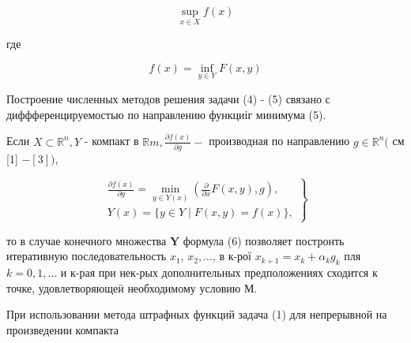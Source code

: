 \documentclass[10pt]{article}
\begin{document}
\[

\sup _{x \in X} f(x)

\]



где



\[

f(x)=\inf _{y \in Y} F(x, y)

\]



Построение численных методов решения задачи (4) - (5) связано с диффференцируемостью по направлению функциіг минимума (5).



Если $X \subset \mathbb{R}^{n}, Y$ - компакт в $\mathbb{R} m, \frac{\partial f(x)}{\partial g}-$ производная по направлению $g \in \mathbb{R}^{n}($ см [1] $-[3])$,



\[

\left.\begin{array}{l}

\frac{\partial f(x)}{\partial g}=\min _{y \in Y(x)}\left(\frac{\partial}{\partial x} F(x, y), g\right), \\

Y(x)=\{y \in Y \mid F(x, y)=f(x)\},

\end{array}\right\}

\]



то в случае конечного множества $\boldsymbol{Y}$ формула (6) позволяет постронть итеративную последовательность $x_{1}$, $x_{2}, \ldots$, в к-рої $x_{k+1}=x_{k}+\alpha_{k} g_{k}$ пля $k=0,1, \ldots$ и к-рая при нек-рых дополнительных предположениях сходится к точке, удовлетворяющеӥ необходимому условию М.



При использовании метода штрафных функций задача (1) для непрерывной на произведении компакта
\end{document}
